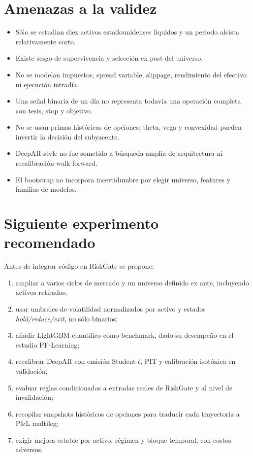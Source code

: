 \documentclass[11pt]{article}
\begin{document}
\section{Amenazas a la validez}
\begin{itemize}
  \item Sólo se estudian diez activos estadounidenses líquidos y un periodo alcista relativamente corto.
  \item Existe sesgo de supervivencia y selección ex post del universo.
  \item No se modelan impuestos, spread variable, slippage, rendimiento del efectivo ni ejecución intradía.
  \item Una señal binaria de un día no representa todavía una operación completa con tesis, stop y objetivo.
  \item No se usan primas históricas de opciones; theta, vega y convexidad pueden invertir la decisión del subyacente.
  \item DeepAR-style no fue sometido a búsqueda amplia de arquitectura ni recalibración walk-forward.
  \item El bootstrap no incorpora incertidumbre por elegir universo, features y familias de modelos.
\end{itemize}

\section{Siguiente experimento recomendado}
Antes de integrar código en RiskGate se propone:
\begin{enumerate}
  \item ampliar a varios ciclos de mercado y un universo definido ex ante, incluyendo activos retirados;
  \item usar umbrales de volatilidad normalizados por activo y estados \emph{hold/reduce/exit}, no sólo binarios;
  \item añadir LightGBM cuantílico como benchmark, dado su desempeño en el estudio PF-Learning;
  \item recalibrar DeepAR con emisión Student-$t$, PIT y calibración isotónica en validación;
  \item evaluar reglas condicionadas a entradas reales de RiskGate y al nivel de invalidación;
  \item recopilar snapshots históricos de opciones para traducir cada trayectoria a P\&L multileg;
  \item exigir mejora estable por activo, régimen y bloque temporal, con costos adversos.
\end{enumerate}
\end{document}

